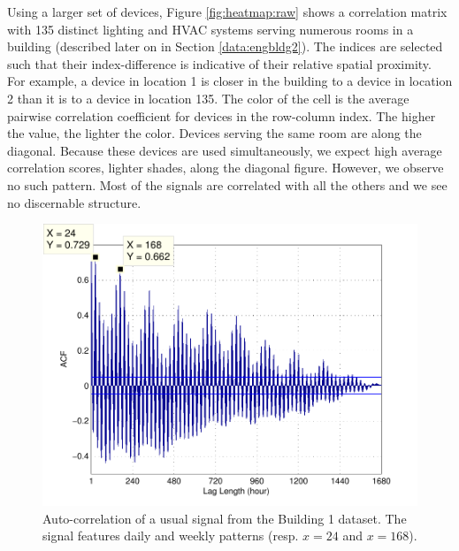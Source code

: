 Using a larger set of devices, Figure \ref{fig:heatmap:raw} shows a correlation matrix with 135 distinct lighting and HVAC systems serving numerous rooms in a building (described later on in Section \ref{data:engbldg2}).
The indices are selected such that their index-difference is indicative of their relative spatial proximity.  
For example, a device in location 1 is closer in the building to a device in location 2 than it is to 
a device in location 135. 
The color of the cell is the average pairwise correlation coefficient for devices in the row-column index.  The higher the value, the lighter the color.
Devices serving the same room are along the diagonal.  Because these devices are used simultaneously, we expect
high average correlation scores, lighter shades, along the diagonal figure.
However, we observe no such pattern.  %
Most of the signals are correlated with all the others and we see no discernable structure.

\begin{figure}[t!]
\begin{center}
\includegraphics[width=.45\textwidth]{img/acf_101A1_GHP-eps-converted-to.pdf}
\caption{Auto-correlation of a usual signal from the Building 1 dataset.
The signal features daily and weekly patterns (resp. $x=24$ and $x=168$).}
\label{fig:autocorr}
\end{center}
\end{figure}

